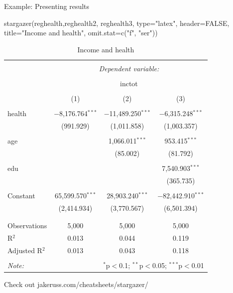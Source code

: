 \documentclass[
  ignorenonframetext,
]{beamer}
\newenvironment{Shaded}{\begin{snugshade}}{\end{snugshade}}
\newcommand{\AttributeTok}[1]{\textcolor[rgb]{0.77,0.63,0.00}{#1}}
\newcommand{\ConstantTok}[1]{\textcolor[rgb]{0.00,0.00,0.00}{#1}}
\newcommand{\FunctionTok}[1]{\textcolor[rgb]{0.00,0.00,0.00}{#1}}
\newcommand{\NormalTok}[1]{#1}
\newcommand{\StringTok}[1]{\textcolor[rgb]{0.31,0.60,0.02}{#1}}
\begin{document}
\begin{frame}[fragile]{Example: Presenting results}
\protect\hypertarget{example-presenting-results}{}
\tiny

\begin{Shaded}
\begin{Highlighting}[]
\FunctionTok{stargazer}\NormalTok{(reghealth,reghealth2, reghealth3, }\AttributeTok{type=}\StringTok{"latex"}\NormalTok{, }\AttributeTok{header=}\ConstantTok{FALSE}\NormalTok{, }
          \AttributeTok{title=}\StringTok{"Income and health"}\NormalTok{, }\AttributeTok{omit.stat=}\FunctionTok{c}\NormalTok{(}\StringTok{"f"}\NormalTok{, }\StringTok{"ser"}\NormalTok{))}
\end{Highlighting}
\end{Shaded}

\begin{table}[!htbp] \centering 
  \caption{Income and health} 
  \label{} 
\begin{tabular}{@{\extracolsep{5pt}}lccc} 
\\[-1.8ex]\hline 
\hline \\[-1.8ex] 
 & \multicolumn{3}{c}{\textit{Dependent variable:}} \\ 
\cline{2-4} 
\\[-1.8ex] & \multicolumn{3}{c}{inctot} \\ 
\\[-1.8ex] & (1) & (2) & (3)\\ 
\hline \\[-1.8ex] 
 health & $-$8,176.764$^{***}$ & $-$11,489.250$^{***}$ & $-$6,315.248$^{***}$ \\ 
  & (991.929) & (1,011.858) & (1,003.357) \\ 
  & & & \\ 
 age &  & 1,066.011$^{***}$ & 953.415$^{***}$ \\ 
  &  & (85.002) & (81.792) \\ 
  & & & \\ 
 edu &  &  & 7,540.903$^{***}$ \\ 
  &  &  & (365.735) \\ 
  & & & \\ 
 Constant & 65,599.570$^{***}$ & 28,903.240$^{***}$ & $-$82,442.910$^{***}$ \\ 
  & (2,414.934) & (3,770.567) & (6,501.394) \\ 
  & & & \\ 
\hline \\[-1.8ex] 
Observations & 5,000 & 5,000 & 5,000 \\ 
R$^{2}$ & 0.013 & 0.044 & 0.119 \\ 
Adjusted R$^{2}$ & 0.013 & 0.043 & 0.118 \\ 
\hline 
\hline \\[-1.8ex] 
\textit{Note:}  & \multicolumn{3}{r}{$^{*}$p$<$0.1; $^{**}$p$<$0.05; $^{***}$p$<$0.01} \\ 
\end{tabular} 
\end{table} 
\normalsize

Check out jakeruss.com/cheatsheets/stargazer/
\end{frame}
\end{document}
